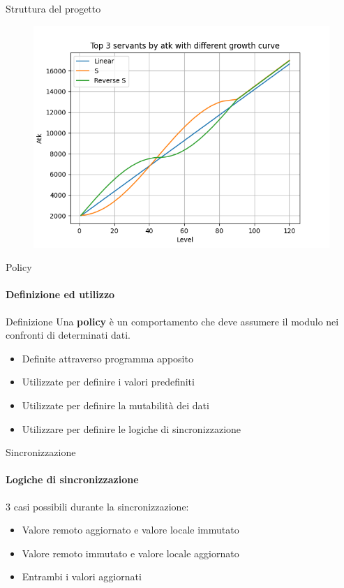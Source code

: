 \documentclass{beamer}
\begin{document}
\begin{darkframes}
  \begin{frame}{Struttura del progetto}
    \begin{figure}
      \centering
      \hspace{-1cm}
      \includegraphics[scale=0.325]{./images/growth.png}
    \end{figure}
  \end{frame}

  \begin{frame}{Policy}
    \framesubtitle{Definizione ed utilizzo}
    \begin{block}{Definizione}
      Una \textbf{policy} è un comportamento che deve assumere il modulo nei confronti di determinati dati.
    \end{block}
    \begin{itemize}
      \item Definite attraverso programma apposito
      \item Utilizzate per definire i valori predefiniti
      \item Utilizzate per definire la mutabilità dei dati
      \item Utilizzare per definire le logiche di sincronizzazione
    \end{itemize}

  \end{frame}

  \begin{frame}{Sincronizzazione}
    \framesubtitle{Logiche di sincronizzazione}
    3 casi possibili durante la sincronizzazione:
    \begin{itemize}
      \item Valore remoto aggiornato e valore locale immutato
      \item Valore remoto immutato e valore locale aggiornato
      \item Entrambi i valori aggiornati
    \end{itemize}


\end{frame}
\end{darkframes}
\end{document}
